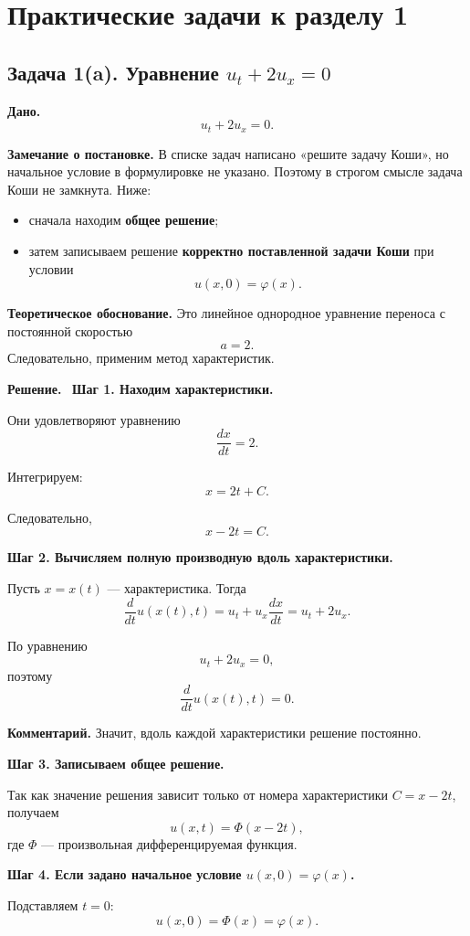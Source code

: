 \documentclass[a4paper,12pt]{article}
\newcommand{\Solution}{\textbf{Решение.}\ }
\begin{document}
\section*{Практические задачи к разделу 1}

\subsection*{Задача 1(a). Уравнение \texorpdfstring{$u_t+2u_x=0$}{ut+2ux=0}}

\textbf{Дано.}
\[
u_t+2u_x=0.
\]

\textbf{Замечание о постановке.} В списке задач написано «решите задачу Коши», но начальное условие в формулировке не указано. Поэтому в строгом смысле задача Коши не замкнута. Ниже:
\begin{itemize}
  \item сначала находим \textbf{общее решение};
  \item затем записываем решение \textbf{корректно поставленной задачи Коши} при условии
  \[
  u(x,0)=\varphi(x).
  \]
\end{itemize}

\textbf{Теоретическое обоснование.}
Это линейное однородное уравнение переноса с постоянной скоростью
\[
a=2.
\]
Следовательно, применим метод характеристик.

\Solution
\textbf{Шаг 1. Находим характеристики.}

Они удовлетворяют уравнению
\[
\frac{dx}{dt}=2.
\]

Интегрируем:
\[
x=2t+C.
\]

Следовательно,
\[
x-2t=C.
\]

\textbf{Шаг 2. Вычисляем полную производную вдоль характеристики.}

Пусть $x=x(t)$ --- характеристика. Тогда
\[
\frac{d}{dt}u(x(t),t)=u_t+u_x\frac{dx}{dt}=u_t+2u_x.
\]

По уравнению
\[
u_t+2u_x=0,
\]
поэтому
\[
\frac{d}{dt}u(x(t),t)=0.
\]

\textbf{Комментарий.} Значит, вдоль каждой характеристики решение постоянно.

\textbf{Шаг 3. Записываем общее решение.}

Так как значение решения зависит только от номера характеристики $C=x-2t$, получаем
\[
u(x,t)=\Phi(x-2t),
\]
где $\Phi$ --- произвольная дифференцируемая функция.

\textbf{Шаг 4. Если задано начальное условие $u(x,0)=\varphi(x)$.}

Подставляем $t=0$:
\[
u(x,0)=\Phi(x)=\varphi(x).
\]
\end{document}
